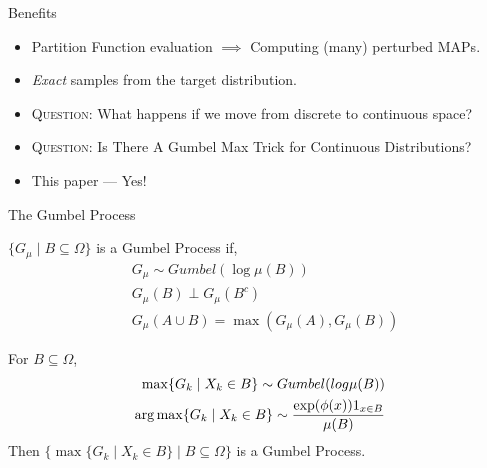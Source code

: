 \begin{frame}{Benefits}
  \begin{itemize}[<+->]
  \item Partition Function evaluation $\implies$ Computing (many) perturbed MAPs.
  \item \emph{Exact} samples from the target distribution. %
  \end{itemize}
  
  \begin{itemize}[<+->]
  \item \textsc{Question:} What happens if we move from discrete to continuous space?
  \item \textsc{Question:} Is There A Gumbel Max Trick for Continuous Distributions?
  \item {\color{red} This paper --- Yes!}
  \end{itemize}
\end{frame}

\begin{frame}{The Gumbel Process}
    \footnotesize{
  \begin{definition}
    $\{G_\mu \mid B \subseteq \Omega\}$ is a Gumbel Process if,
    \begin{align*} 
      & G_\mu \sim Gumbel(\log \mu(B)) \tag{samples are maxes}\\
      & G_\mu(B) \perp G_\mu(B^c) \tag{samples are disjoint}\\
      & G_\mu(A \cup B) = \max(G_\mu(A),G_\mu(B)) \tag{maxes are consistent}
    \end{align*}
  \end{definition}
  \begin{property}
    For $B \subseteq \Omega$,
    \begin{align*}
      \max \{G_k \mid X_k \in B\} \sim Gumbel(log \mu(B)) \\
      \operatorname*{{arg\,max}} \{G_k \mid X_k \in B\} \sim \frac{\exp(\phi(x))1_{x \in B}}{\mu(B)}
    \end{align*}
    Then $\{ \max \{G_k \mid X_k \in B\} \mid B \subseteq \Omega\}$ is a Gumbel Process.
  \end{property}
  }
\end{frame}

